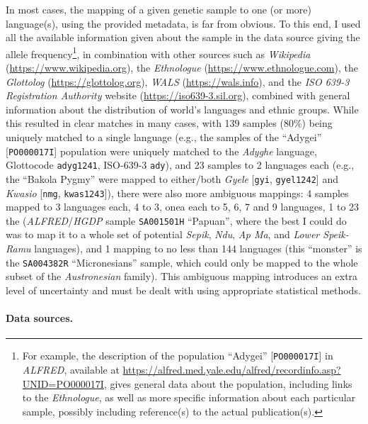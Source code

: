 \documentclass[twoside,twocolumn]{article}
\begin{document}
In most cases, the mapping of a given genetic sample to one (or more) language(s), using the provided metadata, is far from obvious.
To this end, I used all the available information given about the sample in the data source giving the allele frequency\footnote{For example, the description of the population ``Adygei'' [\texttt{PO000017I}] in \textit{ALFRED}, available at \url{https://alfred.med.yale.edu/alfred/recordinfo.asp?UNID=PO000017I}, gives general data about the population, including links to the \textit{Ethnologue}, as well as more specific information about each particular sample, possibly including reference(s) to the actual publication(s).}, in combination with other sources such as \textit{Wikipedia} (\url{https://www.wikipedia.org}), the \textit{Ethnologue} (\url{https://www.ethnologue.com}), the \textit{Glottolog} (\url{https://glottolog.org}), \textit{WALS} (\url{https://wals.info}), and the \textit{ISO 639-3 Registration Authority} website (\url{https://iso639-3.sil.org}), combined with general information about the distribution of world's languages and ethnic groups.
While this resulted in clear matches in many cases, with 139 samples (80\%) being uniquely matched to a single language (e.g., the samples of the ``Adygei'' [\texttt{PO000017I}] population were uniquely matched to the \textit{Adyghe} language, Glottocode \texttt{adyg1241}, ISO-639-3 \texttt{ady}), and 23 samples to 2 languages each (e.g., the ``Bakola Pygmy'' were mapped to either/both \textit{Gyele} [\texttt{gyi}, \texttt{gyel1242}] and \textit{Kwasio} [\texttt{nmg}, \texttt{kwas1243}]), there were also more ambiguous mappings: 4 samples mapped to 3 languages each, 4 to 3, onea each to 5, 6, 7 and 9 languages, 1 to 23 the (\textit{ALFRED}/\textit{HGDP} sample \texttt{SA001501H} ``Papuan'', where the best I could do was to map it to a whole set of potential \textit{Sepik}, \textit{Ndu}, \textit{Ap Ma}, and\textit{ Lower Speik-Ramu} languages), and 1 mapping to no less than 144 languages (this ``monster'' is the \texttt{SA004382R} ``Micronesians'' sample, which could only be mapped to the whole subset of the \textit{Austronesian} family).
This ambiguous mapping introduces an extra level of uncertainty and must be dealt with using appropriate statistical methods.

\paragraph{Data sources.}
\end{document}
